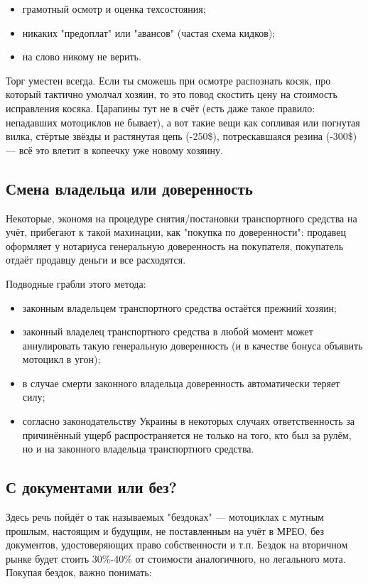 \documentclass[12pt,a4paper]{article}
\begin{document}
\begin{itemize}
\item грамотный осмотр и оценка техсостояния;
\item никаких "предоплат" или "авансов" (частая схема кидков);
\item на слово никому не верить.
\end{itemize}

Торг уместен всегда. Если ты сможешь при осмотре распознать косяк,
про который тактично умолчал хозяин, то это повод скостить цену на
стоимость исправления косяка. Царапины тут не в счёт (есть даже такое
правило: непадавших мотоциклов не бывает), а вот такие вещи как сопливая
или погнутая вилка, стёртые звёзды и растянутая цепь (-250\$),
потрескавшаяся резина (-300\$) --- всё это влетит в копеечку уже новому
хозяину.

\subsection{Смена владельца или доверенность}

Некоторые, экономя на процедуре снятия/постановки транспортного
средства на учёт, прибегают к такой махинации, как "покупка по
доверенности": продавец оформляет у нотариуса генеральную доверенность
на покупателя, покупатель отдаёт продавцу деньги и все расходятся.

Подводные грабли этого метода:

\begin{itemize}
\item законным владельцем транспортного средства остаётся прежний
хозяин;
\item законный владелец транспортного средства в любой момент может
аннулировать такую генеральную доверенность (и в качестве бонуса
объявить мотоцикл в угон);
\item в случае смерти законного владельца доверенность автоматически
теряет силу;
\item согласно законодательству Украины в некоторых случаях
ответственность за причинённый ущерб распространяется не только на того,
кто был за рулём, но и на законного владельца транспортного средства.
\end{itemize}

\subsection{С документами или без?}

Здесь речь пойдёт о так называемых "бездоках" --- мотоциклах с мутным
прошлым, настоящим и будущим, не поставленным на учёт в МРЕО, без
документов, удостоверяющих право собственности и т.п. Бездок на
вторичном рынке будет стоить 30\%-40\% от стоимости аналогичного,
но легального мота. Покупая бездок, важно понимать:
\end{document}
